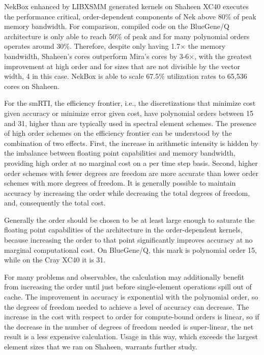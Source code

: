 NekBox enhanced by LIBXSMM generated kernels on Shaheen XC40 executes the performance critical, order-dependent components of Nek above 80\% of peak memory bandwidth.
For comparison, compiled code on the BlueGene/Q architecture is only able to
reach 50\% of peak and for many polynomial orders operates around 30\%.
Therefore, despite only having 1.7$\times$ the memory bandwidth, Shaheen's cores
outperform Mira's cores by 3-6$\times$, with the greatest improvement at high
order and for sizes that are not divisible by the vector width, 4 in this case.
NekBox is able to scale 67.5\% utilization rates to 65,536 cores on Shaheen.


For the smRTI, the efficiency frontier, i.e., the discretizations that minimize
cost given accuracy or minimize error given cost, have polynomial orders between 15 and 31, higher than are typically used in spectral element schemes.
The presence of high order schemes on the efficiency frontier can be understood by the combination of two effects.
First, the increase in arithmetic intensity is hidden by the imbalance between floating point capabilities and memory bandwidth, providing high order at no marginal cost on a per time step basis.
Second, higher order schemes with fewer degrees are freedom are more accurate than lower order schemes with more degrees of freedom.
It is generally possible to maintain accuracy by increasing the order while decreasing the total degrees of freedom, and, consequently the total cost.

Generally the order should be chosen to be at least large enough to saturate the floating point capabilities of the architecture in the order-dependent kernels, because increasing the order to that point significantly improves accuracy at no marginal computational cost.
On BlueGene/Q, this mark is polynomial order 15, while on the Cray XC40 it is 31.

For many problems and observables, the calculation may additionally benefit from increasing the order until just before single-element operations spill out of cache.
The improvement in accuracy is exponential with the polynomial order, so the degrees of freedom needed to achieve a level of accuracy can decrease.
The increase in the cost with respect to order for compute-bound orders is linear, so if the decrease in the number of degrees of freedom needed is super-linear, the net result is a less expensive calculation.
Usage in this way, which exceeds the largest element sizes that we ran on Shaheen, warrants further study.

